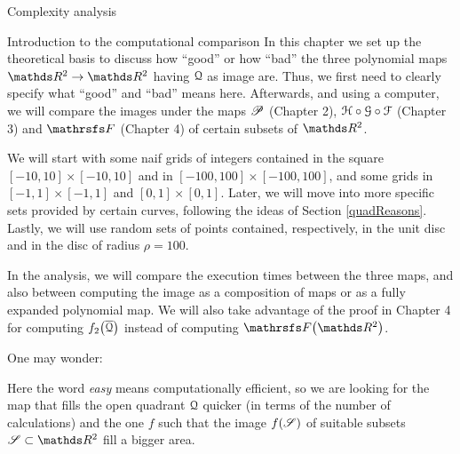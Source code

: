 \documentclass[11pt, a4paper, english, twoside, notitlepage, openright]{report}
\begin{document}
\begin{chapter}{Complexity analysis}\label{compChapter}

\begin{section}{Introduction to the computational comparison}\label{5sect1}
In this chapter we set up the theoretical basis to discuss how ``good'' or how ``bad'' the three polynomial maps $\R^2\to\R^2$ having ${\Qu}$ as image are. Thus, we first need to clearly specify what ``good'' and ``bad'' means here. Afterwards, and using a computer, we will compare the images under the maps $\P$ (Chapter 2), $\HH\circ\GG\circ\FF$ (Chapter 3) and $\FFF$ (Chapter 4) of certain subsets of $\R^2$.

We will start with some naif grids of integers contained in the square $[-10, 10]\times[-10, 10]$ and in $[-100, 100]\times[-100, 100]$, and some grids in $[-1, 1]\times[-1, 1]$ and $[0, 1]\times[0, 1]$. Later, we will move into more specific sets provided by certain curves, following the ideas of  Section \ref{quadReasons}. Lastly, we will use random sets of points contained, respectively, in the unit disc and in the disc of radius $\rho=100$.

In the analysis, we will compare the execution times between the three maps, and also between computing the image as a composition of maps or as a fully expanded polynomial map. We will also take advantage of the proof in Chapter 4 for computing $f_2\big(\overline{\Qu}\big)$ instead of computing $\FFF\big(\R^2\big)$.

One may wonder:

\begin{center}
\end{center}

Here the word \textit{easy} means computationally efficient, so we are looking for the map that fills the open quadrant $\Qu$ quicker (in terms of the number of calculations) and the one $f$ such that the image $f(\Ss)$ of suitable subsets $\Ss\subset\R^2$ fill a bigger area.


\end{section}
\end{chapter}
\end{document}
